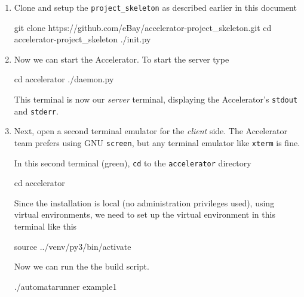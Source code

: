 \documentclass[a4paper]{article}
\begin{document}
\begin{enumerate}
\item Clone and setup the \texttt{project\_skeleton} as described
  earlier in this document
\begin{shell}
git clone https://github.com/eBay/accelerator-project_skeleton.git
cd accelerator-project_skeleton
./init.py
\end{shell}

\item Now we can start the Accelerator.  To start the server type
  \begin{shell}
cd accelerator
./daemon.py
  \end{shell}
  This terminal is now our \textsl{server} terminal, displaying the
  Accelerator's \texttt{stdout} and \texttt{stderr}.
  
\item Next, open a second terminal emulator for the \textsl{client}
  side.  The Accelerator team prefers using GNU \texttt{screen}, but any
  terminal emulator like \texttt{xterm} is fine.

  In this second terminal (green), \texttt{cd} to the
  \texttt{accelerator} directory
\begin{shell2}
cd accelerator
\end{shell2}
Since the installation is local (no administration privileges used),
using virtual environments, we need to set up the virtual environment
in this terminal like this
\begin{shell2}
source ../venv/py3/bin/activate
\end{shell2}
Now we can run the the build script.
\begin{shell2}
./automatarunner example1
\end{shell2}
\end{enumerate}
\end{document}
